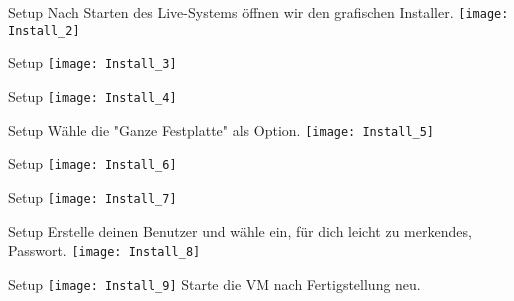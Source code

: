 \begin{frame}{Setup}
    Nach Starten des Live-Systems öffnen wir den grafischen Installer.
    \texttt{[image: Install\_2]}
\end{frame}

\begin{frame}{Setup}
    \texttt{[image: Install\_3]}
\end{frame}

\begin{frame}{Setup}
    \texttt{[image: Install\_4]}
\end{frame}

\begin{frame}{Setup}
    Wähle die "Ganze Festplatte" als Option.
    \texttt{[image: Install\_5]}
\end{frame}

\begin{frame}{Setup}
    \texttt{[image: Install\_6]}
\end{frame}

\begin{frame}{Setup}
    \texttt{[image: Install\_7]}
\end{frame}

\begin{frame}{Setup}
    Erstelle deinen Benutzer und wähle ein, für dich leicht zu merkendes, Passwort.
    \texttt{[image: Install\_8]}
\end{frame}

\begin{frame}{Setup}
    \texttt{[image: Install\_9]}
    Starte die VM nach Fertigstellung neu.
\end{frame}
